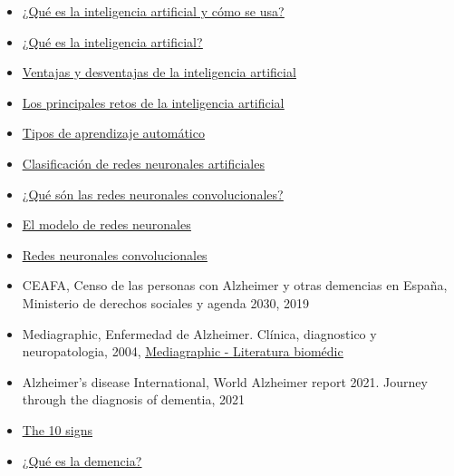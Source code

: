 \documentclass[a4paper,12pt]{article}
\begin{document}
\begin{itemize}
    \item \href{https://www.europarl.europa.eu/news/es/headlines/society/20200827STO85804/que-es-la-inteligencia-artificial-y-como-se-usa}{\underline{¿Qué es la inteligencia artificial y cómo se usa?}}
    \item \href{https://www.iberdrola.com/innovacion/que-es-inteligencia-artificial}{\underline{¿Qué es la inteligencia artificial?}}
    \item \href{https://nexusintegra.io/es/ventajas-y-desventajas-de-la-inteligencia-artificial/}{\underline{Ventajas y desventajas de la inteligencia artificial}}
    \item \href{https://www.santander.com/es/sala-de-comunicacion/dp/los-principales-retos-de-la-inteligencia-artificial}{\underline{Los principales retos de la inteligencia artificial}}
    \item \href{https://keepcoding.io/blog/tipos-de-aprendizaje-automatico/}{\underline{Tipos de aprendizaje automático}}
    \item \href{https://www.diegocalvo.es/clasificacion-de-redes-neuronales-artificiales/}{\underline{Clasificación de redes neuronales artificiales}}
    \item \href{https://keepcoding.io/blog/redes-neuronales-convolucionales/#Que_son_las_Redes_Neuronales_Convolucionales}{\underline{¿Qué són las redes neuronales convolucionales?}}
    \item \href{https://www.ibm.com/docs/es/spss-modeler/saas?topic=networks-neural-model}{\underline{El modelo de redes neuronales}}
    \item \href{https://www.juanbarrios.com/redes-neurales-convolucionales/ }{\underline{Redes neuronales convolucionales}}
    \item CEAFA, Censo de las personas con Alzheimer y otras demencias en España, Ministerio de derechos sociales y agenda 2030, 2019
    \item Mediagraphic, Enfermedad de Alzheimer. Clínica, diagnostico y neuropatologia, 2004, \href{https://www.medigraphic.com/newMedi/}{\underline{Mediagraphic - Literatura biomédic}}
    \item Alzheimer’s disease International, World Alzheimer report 2021. Journey through the diagnosis of dementia, 2021
    \item \href{https://www.alz.org/alzheimers-dementia/10_signs}{\underline{The 10 signs}}
    \item \href{https://www.cdc.gov/aging/spanish/features/dementia.html}{\underline{¿Qué es la demencia?}}

\end{itemize}
\end{document}
